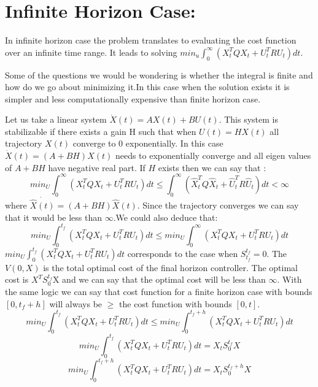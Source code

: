 \documentclass{article}
\begin{document}
\section{Infinite Horizon Case:}
In infinite horizon case the problem translates to evaluating the cost function over an infinite time range. It leads to solving $ min_{u}  \int_{0}^{\infty} (X_{t}^T Q X_{t} + U_{t}^T R U_{t}) dt$.

Some of the questions we would be wondering is whether the integral is finite and how do we go about minimizing it.In this case when the solution exists it is simpler and less computationally expensive than finite horizon case.

Let us take a linear system $\dot X(t) = AX(t) + BU(t)$. This system is stabilizable if there exists a gain H such that when $U(t) = HX(t)$ all trajectory $X(t)$ converge to 0 exponentially. In this case$\dot X(t) = (A+BH)X(t)$ needs to exponentially converge and all eigen values of $A+BH$ have negative real part. If $H$ exists then we can say that :
\begin{equation}
    min_{U} \int_{0}^{\infty}(X_t^{T}QX_t + U_t^{T}RU_t)dt \leq \int_{0}^{\infty}(\hat X_t^{T}Q\hat X_t + \hat U_t^{T}R\hat U_t)dt < \infty 
\end{equation}
where  $\dot {\hat X(t)} = (A+BH)\hat X(t)$. Since the trajectory converges we can say that it would be less than $\infty$.We could also deduce that:
\begin{equation}
    min_{U} \int_{0}^{t_f}(X_t^{T}QX_t + U_t^{T}RU_t)dt \leq min_{U} \int_{0}^{\infty}(X_t^{T}QX_t + U_t^{T}RU_t)dt
\end{equation}
$min_{U} \int_{0}^{t_f}(X_t^{T}QX_t + U_t^{T}RU_t)dt$ corresponds to the case when $S_{t_f}^{t_f} = 0$. The $V(0,X)$ is the total optimal cost of the final horizon controller. The optimal cost is $X^{T}S_0^{t_f}$X and we can say that the optimal cost will be less than $\infty$. With the same logic we can say that cost function for a finite horizon case with bounds $[0,t_f+h]$ will always be $\geq$ the cost function with bounds $[0,t]$.
\begin{equation}
    min_{U} \int_{0}^{t_f}(X_t^{T}QX_t + U_t^{T}RU_t)dt \leq min_{U} \int_{0}^{t_f+h}(X_t^{T}QX_t + U_t^{T}RU_t)dt
\end{equation}
\begin{equation}
    min_{U} \int_{0}^{t_f}(X_t^{T}QX_t + U_t^{T}RU_t)dt = X_tS_0^{t_f}X
\end{equation}
\begin{equation}
    min_{U} \int_{0}^{t_f+h}(X_t^{T}QX_t + U_t^{T}RU_t)dt = X_tS_0^{t_f+h}X
\end{equation}
\end{document}

